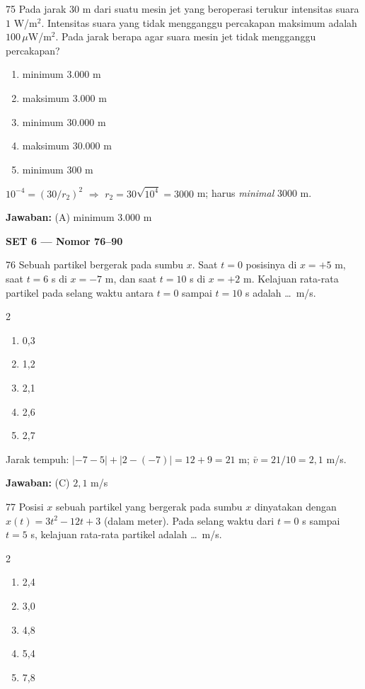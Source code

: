 \documentclass[11pt]{article}
\newenvironment{pil}{%
  \begin{enumerate}[label=(\Alph*),leftmargin=*,itemsep=1pt,topsep=3pt]}%
  {\end{enumerate}}
\newenvironment{pilB}{%
  \par\smallskip\begin{multicols}{2}
  \begin{enumerate}[label=(\Alph*),leftmargin=*,itemsep=1pt,topsep=3pt]}%
  {\end{enumerate}\end{multicols}}
\newcommand{\jawaban}[1]{%
  \noindent\colorbox{gold!30}{\parbox{\dimexpr\linewidth-2\fboxsep\relax}{%
    \textbf{Jawaban:} #1}}\par\smallskip}
\begin{document}
\begin{soal}{75}
Pada jarak 30 m dari suatu mesin jet yang beroperasi terukur intensitas
suara $1$ W/m$^2$. Intensitas suara yang tidak mengganggu percakapan
maksimum adalah $100\,\mu$W/m$^2$. Pada jarak berapa agar suara mesin
jet tidak mengganggu percakapan?
\begin{pil}
  \item minimum 3.000 m \item maksimum 3.000 m \item minimum 30.000 m
  \item maksimum 30.000 m \item minimum 300 m
\end{pil}
\end{soal}

\begin{pembox}
$10^{-4}=(30/r_2)^2$ $\Rightarrow$ $r_2=30\sqrt{10^4}=3000$ m; harus \emph{minimal} 3000 m.
\jawaban{(A) minimum 3.000 m}
\end{pembox}


\begin{center}\large\bfseries SET 6 --- Nomor 76--90\end{center}

\begin{soal}{76}
Sebuah partikel bergerak pada sumbu $x$. Saat $t=0$ posisinya di
$x=+5$ m, saat $t=6$ s di $x=-7$ m, dan saat $t=10$ s di $x=+2$ m.
Kelajuan rata-rata partikel pada selang waktu antara $t=0$ sampai
$t=10$ s adalah \ldots\ m/s.
\begin{pilB}
  \item 0,3 \item 1,2 \item 2,1 \item 2,6 \item 2,7
\end{pilB}
\end{soal}

\begin{pembox}
Jarak tempuh: $|{-7-5}|+|2-(-7)|=12+9=21$ m; $\bar v=21/10=2{,}1$ m/s.
\jawaban{(C) $2{,}1$ m/s}
\end{pembox}

\begin{soal}{77}
Posisi $x$ sebuah partikel yang bergerak pada sumbu $x$ dinyatakan
dengan $x(t)=3t^2-12t+3$ (dalam meter). Pada selang waktu dari $t=0$ s
sampai $t=5$ s, kelajuan rata-rata partikel adalah \ldots\ m/s.
\begin{pilB}
  \item 2,4 \item 3,0 \item 4,8 \item 5,4 \item 7,8
\end{pilB}
\end{soal}
\end{document}

